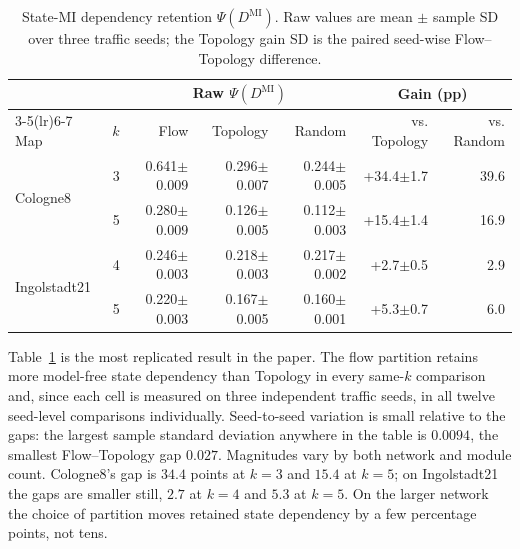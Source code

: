 \documentclass[journal]{IEEEtran}
\theoremstyle{definition}
\begin{document}
\begin{table}[t]
    \centering
    \caption{State-MI dependency retention $\Psi(D^{\mathrm{MI}})$. Raw values
        are mean $\pm$ sample SD over three traffic seeds; the Topology gain SD
        is the paired seed-wise Flow--Topology difference.}
    \label{tab:psi-mi}
    \scriptsize
    \setlength{\tabcolsep}{2.5pt}
    \begin{tabular}{lrrrrrr}
        \toprule
                                      &     & \multicolumn{3}{c}{Raw $\Psi(D^{\mathrm{MI}})$} & \multicolumn{2}{c}{Gain (pp)}                                                \\
        \cmidrule(lr){3-5}\cmidrule(lr){6-7}
        Map                           & $k$ & Flow                                            & Topology                      & Random          & vs. Topology  & vs. Random \\
        \midrule
        \multirow{2}{*}{Cologne8}     & 3   & 0.641$\pm$0.009                                 & 0.296$\pm$0.007               & 0.244$\pm$0.005 & +34.4$\pm$1.7 & 39.6       \\
                                      & 5   & 0.280$\pm$0.009                                 & 0.126$\pm$0.005               & 0.112$\pm$0.003 & +15.4$\pm$1.4 & 16.9       \\\midrule
        \multirow{2}{*}{Ingolstadt21} & 4   & 0.246$\pm$0.003                                 & 0.218$\pm$0.003               & 0.217$\pm$0.002 & +2.7$\pm$0.5  & 2.9        \\
                                      & 5   & 0.220$\pm$0.003                                 & 0.167$\pm$0.005               & 0.160$\pm$0.001 & +5.3$\pm$0.7  & 6.0        \\
        \bottomrule
    \end{tabular}
\end{table}

Table~\ref{tab:psi-mi} is the most replicated result in the paper. The flow partition retains more model-free state dependency than Topology in every same-$k$ comparison and, since each cell is measured on three independent traffic seeds, in all twelve seed-level comparisons individually. Seed-to-seed variation is small relative to the gaps: the largest sample standard deviation anywhere in the table is $0.0094$, the smallest Flow--Topology gap $0.027$.
Magnitudes vary by both network and module count.
Cologne8's gap is $34.4$ points at $k=3$ and $15.4$ at $k=5$; on Ingolstadt21 the gaps are smaller still, $2.7$ at $k=4$ and $5.3$ at $k=5$. On the larger network the choice of partition moves retained state dependency by a few percentage points, not tens.
\end{document}
